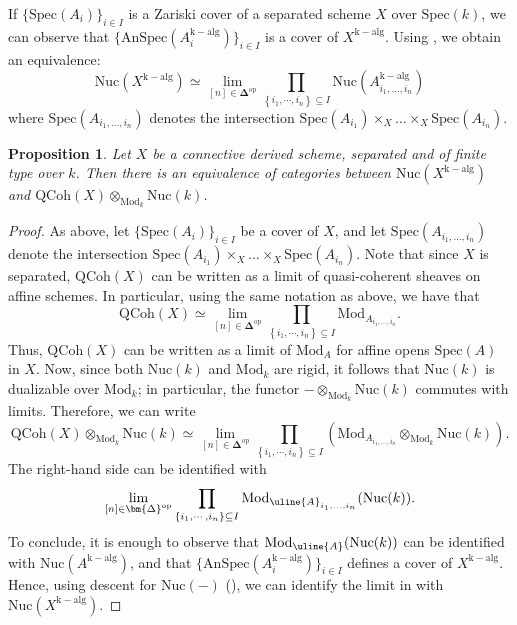 \documentclass[oneside, hidelinks, 12pt, a4paper,reqno]{amsart}
\newcommand{\bDelta}{\bm{\Delta}} %
\theoremstyle{plain}
\theoremstyle{definition}
\theoremstyle{plain}
\newtheorem{proposition}[proposition]{Proposition}
\newcommand{\Spec}{\mathrm{Spec}}
\newcommand{\Nuc}{\mathrm{Nuc}}
\newcommand{\Qcoh}{\mathrm{QCoh}}
\newcommand{\Mod}{\mathrm{Mod}}
\begin{document}
If $\{\Spec(A_{i})\}_{i \in I}$ is a Zariski cover of a separated scheme $X$ over $\Spec(k)$, we can observe that $\{\mathrm{AnSpec}(A_{i}^{\mathrm{k-alg}})\}_{i \in I}$ is a cover of $X^{\mathrm{k-alg}}$. Using , we obtain an equivalence:
\[
\Nuc(X^{\mathrm{k-alg}}) \simeq \lim_{[n]\in\bDelta^{\mathrm{op}}}\prod_{\left\{i_1,\cdots,i_n\right\}\subseteq I}\Nuc(A_{i_1, \dots, i_{n}}^{\mathrm{k-alg}})
\]
where $\Spec(A_{i_1, \dots, i_{n}})$ denotes the intersection $\Spec(A_{i_{1}})\times_{X}\dots \times_{X}\Spec(A_{i_{n}})$.

\begin{proposition}\label{prop: algebraic GAGA}
    Let $X$ be a connective derived scheme, separated and of finite type over $k$. Then there is an equivalence of categories between $\Nuc(X^{\mathrm{k-alg}})$ and $\Qcoh(X)\otimes_{\Mod_{k}}\Nuc(k)$.
\end{proposition}
\begin{proof}
    As above, let $\{\Spec(A_{i})\}_{i \in I}$ be a cover of $X$, and let $\Spec(A_{i_1, \dots, i_{n}})$ denote the intersection $\Spec(A_{i_{1}})\times_{X}\dots \times_{X}\Spec(A_{i_{n}})$. Note that since $X$ is separated, $\Qcoh(X)$ can be written as a limit of quasi-coherent sheaves on affine schemes. In particular, using the same notation as above, we have that 
    \[
    \Qcoh(X) \simeq \lim_{[n]\in\bDelta^{\mathrm{op}}}\prod_{\left\{i_1,\cdots,i_n\right\}\subseteq I}\Mod_{A_{i_1, \dots, i_{n}}}.
    \]
    Thus, $\Qcoh(X)$ can be written as a limit of $\Mod_{A}$ for affine opens $\Spec(A)$ in $X$.
    Now, since both $\Nuc(k)$ and $\Mod_{k}$ are rigid, it follows that $\Nuc(k)$ is dualizable over $\Mod_{k}$; in particular, the functor 
    $-\otimes_{\Mod_{k}}\Nuc(k)$ commutes with limits. Therefore, we can write 
    \begin{equation}\label{eq:Kunneth limit}
        \Qcoh(X)\otimes_{\Mod_{k}}\Nuc(k) \simeq \lim_{[n]\in\bDelta^{\mathrm{op}}}\prod_{\left\{i_1,\cdots,i_n\right\}\subseteq I}\left(\Mod_{A_{i_1, \dots, i_{n}}}\otimes_{\Mod_k}\Nuc(k)\right).
    \end{equation}
    The right-hand side can be identified with 
    \[
     \lim_{[n]\in\bDelta^{\mathrm{op}}}\prod_{\left\{i_1,\cdots,i_n\right\}\subseteq I}\Mod_{\uline{A}_{i_1, \dots, i_{n}}}(\Nuc(k)).
    \]
    To conclude, it is enough to observe that $\Mod_{\uline{A}}(\Nuc(k))$ can be identified with $\Nuc(A^{\mathrm{k-alg}})$, and that $\{\mathrm{AnSpec}(A_i^{\mathrm{k-alg}})\}_{i \in I}$ defines a cover of $X^{\mathrm{k-alg}}$. Hence, using descent for $\Nuc(-)$ (), we can identify the limit in  with $\Nuc(X^{\mathrm{k-alg}})$.
\end{proof}
\end{document}
